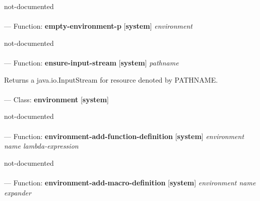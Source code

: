 \begin{adjustwidth}{5em}{5em}
not-documented
\end{adjustwidth}

\paragraph{}
\label{SYSTEM:EMPTY-ENVIRONMENT-P}
--- Function: \textbf{empty-environment-p} [\textbf{system}] \textit{environment}

\begin{adjustwidth}{5em}{5em}
not-documented
\end{adjustwidth}

\paragraph{}
\label{SYSTEM:ENSURE-INPUT-STREAM}
--- Function: \textbf{ensure-input-stream} [\textbf{system}] \textit{pathname}

\begin{adjustwidth}{5em}{5em}
Returns a java.io.InputStream for resource denoted by PATHNAME.
\end{adjustwidth}

\paragraph{}
\label{SYSTEM:ENVIRONMENT}
--- Class: \textbf{environment} [\textbf{system}] \textit{}

\begin{adjustwidth}{5em}{5em}
not-documented
\end{adjustwidth}

\paragraph{}
\label{SYSTEM:ENVIRONMENT-ADD-FUNCTION-DEFINITION}
--- Function: \textbf{environment-add-function-definition} [\textbf{system}] \textit{environment name lambda-expression}

\begin{adjustwidth}{5em}{5em}
not-documented
\end{adjustwidth}

\paragraph{}
\label{SYSTEM:ENVIRONMENT-ADD-MACRO-DEFINITION}
--- Function: \textbf{environment-add-macro-definition} [\textbf{system}] \textit{environment name expander}

